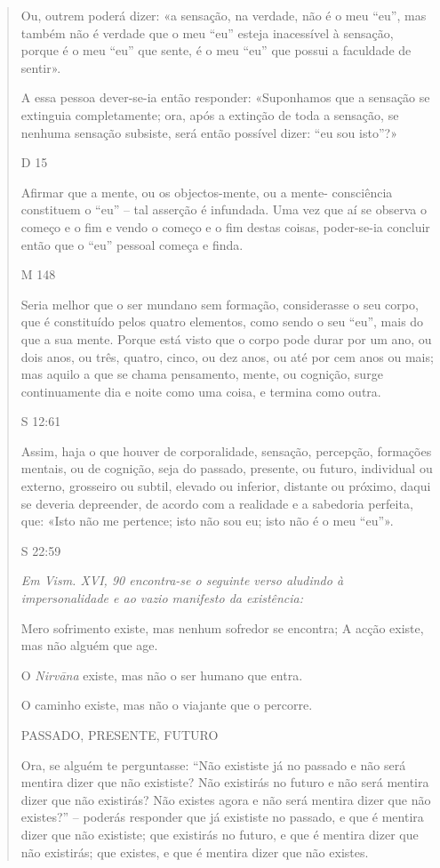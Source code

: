 \begin{quote}
Ou, outrem poderá dizer: «a sensação, na verdade, não é o meu ``eu'', mas também não é verdade que o meu ``eu'' esteja inacessível à sensação, porque é o meu ``eu'' que sente, é o meu ``eu'' que possui a faculdade de sentir».

A essa pessoa dever-se-ia então responder: «Suponhamos que a sensação se extinguia completamente; ora, após a extinção de toda a sensação, se nenhuma sensação subsiste, será então possível dizer: ``eu sou isto''?»

D 15

Afirmar que a mente, ou os objectos-mente, ou a mente- consciência constituem o ``eu'' -- tal asserção é infundada. Uma vez que aí se observa o começo e o fim e vendo o começo e o fim destas coisas, poder-se-ia concluir então que o ``eu'' pessoal começa e finda.

M 148

Seria melhor que o ser mundano sem formação, considerasse o seu corpo, que é constituído pelos quatro elementos, como sendo o seu ``eu'', mais do que a sua mente. Porque está visto que o corpo pode durar por um ano, ou dois anos, ou três, quatro, cinco, ou dez anos, ou até por cem anos ou mais; mas aquilo a que se chama pensamento, mente, ou cognição, surge continuamente dia e noite como uma coisa, e termina como outra.

S 12:61

Assim, haja o que houver de corporalidade, sensação, percepção, formações mentais, ou de cognição, seja do passado, presente, ou futuro, individual ou externo, grosseiro ou subtil, elevado ou inferior, distante ou próximo, daqui se deveria depreender, de acordo com a realidade e a sabedoria perfeita, que: «Isto não me pertence; isto não sou eu; isto não é o meu ``eu''».

S 22:59

\emph{Em Vism. XVI, 90 encontra-se o seguinte verso aludindo à impersonalidade e ao vazio manifesto da existência:}

Mero sofrimento existe, mas nenhum sofredor se encontra; A acção existe, mas não alguém que age.

O \emph{Nirvāna} existe, mas não o ser humano que entra.

O caminho existe, mas não o viajante que o percorre.

PASSADO, PRESENTE, FUTURO

Ora, se alguém te perguntasse: ``Não exististe já no passado e não será mentira dizer que não exististe? Não existirás no futuro e não será mentira dizer que não existirás? Não existes agora e não será mentira dizer que não existes?'' -- poderás responder que já exististe no passado, e que é mentira dizer que não exististe; que existirás no futuro, e que é mentira dizer que não existirás; que existes, e que é mentira dizer que não existes.


\end{quote}
